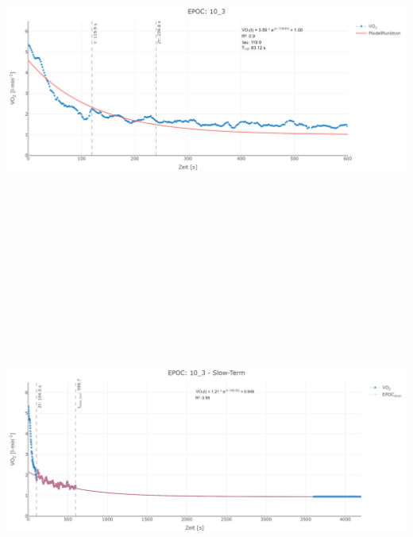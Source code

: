 \documentclass[
  letterpaper,
  DIV=11]{scrartcl}
\begin{document}
\includegraphics[width=11.45833in,height=4.6875in]{images/10_3_tau.png}
\includegraphics[width=11.45833in,height=4.6875in]{images/10_3_slow.png}
\end{document}
